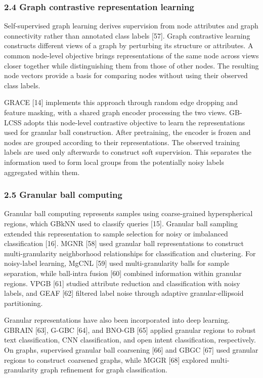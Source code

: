 \subsubsection{2.4 Graph contrastive representation learning}\label{graph-contrastive-representation-learning}

Self-supervised graph learning derives supervision from node attributes and graph connectivity rather than annotated class labels {[}57{]}. Graph contrastive learning constructs different views of a graph by perturbing its structure or attributes. A common node-level objective brings representations of the same node across views closer together while distinguishing them from those of other nodes. The resulting node vectors provide a basis for comparing nodes without using their observed class labels.

GRACE {[}14{]} implements this approach through random edge dropping and feature masking, with a shared graph encoder processing the two views. GB-LCSS adopts this node-level contrastive objective to learn the representations used for granular ball construction. After pretraining, the encoder is frozen and nodes are grouped according to their representations. The observed training labels are used only afterwards to construct soft supervision. This separates the information used to form local groups from the potentially noisy labels aggregated within them.

\subsubsection{2.5 Granular ball computing}\label{granular-ball-computing}

Granular ball computing represents samples using coarse-grained hyperspherical regions, which GBkNN used to classify queries {[}15{]}. Granular ball sampling extended this representation to sample selection for noisy or imbalanced classification {[}16{]}. MGNR {[}58{]} used granular ball representations to construct multi-granularity neighborhood relationships for classification and clustering. For noisy-label learning, MgCNL {[}59{]} used multi-granularity balls for sample separation, while ball-intra fusion {[}60{]} combined information within granular regions. VPGB {[}61{]} studied attribute reduction and classification with noisy labels, and GEAF {[}62{]} filtered label noise through adaptive granular-ellipsoid partitioning.

Granular representations have also been incorporated into deep learning. GBRAIN {[}63{]}, G-GBC {[}64{]}, and BNO-GB {[}65{]} applied granular regions to robust text classification, CNN classification, and open intent classification, respectively. On graphs, supervised granular ball coarsening {[}66{]} and GBGC {[}67{]} used granular regions to construct coarsened graphs, while MGGR {[}68{]} explored multi-granularity graph refinement for graph classification.

